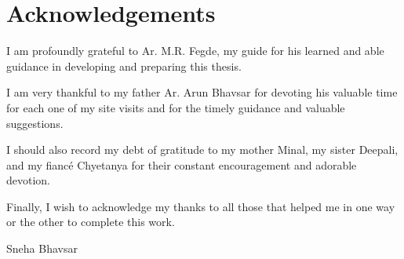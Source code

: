 \section*{Acknowledgements} %
\label{sec:ack}

I am profoundly grateful to Ar. M.R. Fegde, my guide for his learned and able guidance in developing and preparing this thesis.

I am very thankful to my father Ar. Arun Bhavsar for devoting his valuable time for each one of my site visits and for the timely guidance and valuable suggestions.

I should also record my debt of gratitude to my mother Minal, my sister Deepali, and my fianc\'{e} Chyetanya for their constant encouragement and adorable devotion.

Finally, I wish to acknowledge my thanks to all those that helped me in one way or the other to complete this work.

\vspace{3mm}
\hfill Sneha Bhavsar

\vfill

